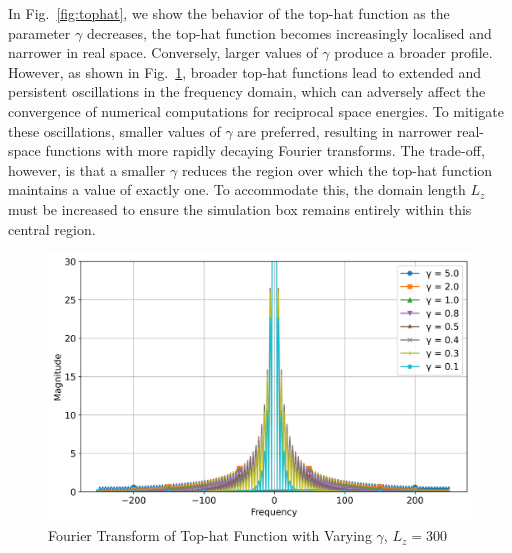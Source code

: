 In Fig.~\ref{fig:tophat}, we show the behavior of the top-hat function  as the parameter $\gamma$ decreases, the top-hat function becomes increasingly localised and narrower in real space. Conversely, larger values of $\gamma$ produce a broader profile. However, as shown in Fig.~\ref{fig:fourieroftophatvarygammaL300}, broader top-hat functions lead to extended and persistent oscillations in the frequency domain, which can adversely affect the convergence of numerical computations for reciprocal space energies. To mitigate these oscillations, smaller values of $\gamma$ are preferred, resulting in narrower real-space functions with more rapidly decaying Fourier transforms. The trade-off, however, is that a smaller $\gamma$ reduces the region over which the top-hat function maintains a value of exactly one. To accommodate this, the domain length $L_z$ must be increased to ensure the simulation box remains entirely within this central region.

\begin{figure}[htbp]
  \centering
  \includegraphics[width=\linewidth]{images/fourieroftophatvarygammaL300.jpg}
  \caption{Fourier Transform of Top-hat Function with Varying $\gamma$, $L_z = 300$}
  \label{fig:fourieroftophatvarygammaL300}
\end{figure}
  

